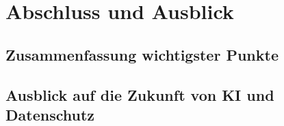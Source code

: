 \chapter{Abschluss und Ausblick}

\section{Zusammenfassung wichtigster Punkte}

\section{Ausblick auf die Zukunft von KI und Datenschutz}